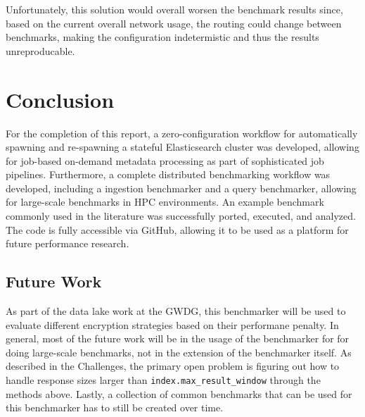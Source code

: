 Unfortunately, this solution would overall worsen the benchmark results since, based on the current overall network usage, the routing could change between benchmarks, making the configuration indetermistic and thus the results unreproducable.

\section{Conclusion}
For the completion of this report, a zero-configuration workflow for automatically spawning and re-spawning a stateful Elasticsearch cluster was developed, allowing for job-based on-demand metadata processing as part of sophisticated job pipelines. Furthermore, a complete distributed benchmarking workflow was developed, including a ingestion benchmarker and a query benchmarker, allowing for large-scale benchmarks in \ac{HPC} environments. An example benchmark commonly used in the literature was successfully ported, executed, and analyzed. The code is fully accessible via GitHub, allowing it to be used as a platform for future performance research.

\subsection{Future Work}
As part of the data lake work at the GWDG, this benchmarker will be used to evaluate different encryption strategies based on their performane penalty. In general, most of the future work will be in the usage of the benchmarker for for doing large-scale benchmarks, not in the extension of the benchmarker itself. As described in the Challenges, the primary open problem is figuring out how to handle response sizes larger than \texttt{index.max\_result\_window} through the methods above. Lastly, a collection of common benchmarks that can be used for this benchmarker has to still be created over time.
